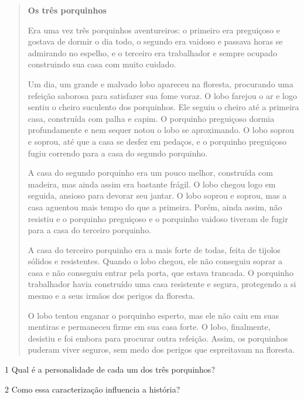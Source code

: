 \begin{quote}
\textbf{Os três porquinhos}

Era uma vez três porquinhos aventureiros: o primeiro era preguiçoso e
gostava de dormir o dia todo, o segundo era vaidoso e passava horas se
admirando no espelho, e o terceiro era trabalhador e sempre ocupado
construindo sua casa com muito cuidado.

Um dia, um grande e malvado lobo apareceu na floresta, procurando uma
refeição saborosa para satisfazer sua fome voraz. O lobo farejou o ar e
logo sentiu o cheiro suculento dos porquinhos. Ele seguiu o cheiro até a
primeira casa, construída com palha e capim. O porquinho preguiçoso
dormia profundamente e nem sequer notou o lobo se aproximando. O lobo
soprou e soprou, até que a casa se desfez em pedaços, e o porquinho
preguiçoso fugiu correndo para a casa do segundo porquinho.

A casa do segundo porquinho era um pouco melhor, construída com madeira,
mas ainda assim era bastante frágil. O lobo chegou logo em seguida,
ansioso para devorar seu jantar. O lobo soprou e soprou, mas a casa
aguentou mais tempo do que a primeira. Porém, ainda assim, não resistiu e
o porquinho preguiçoso e o porquinho vaidoso tiveram de fugir para a casa
do terceiro porquinho.

A casa do terceiro porquinho era a mais forte de todas, feita de tijolos
sólidos e resistentes. Quando o lobo chegou, ele não conseguiu soprar a
casa e não conseguiu entrar pela porta, que estava trancada. O porquinho
trabalhador havia construído uma casa resistente e segura, protegendo a
si mesmo e a seus irmãos dos perigos da floresta.

O lobo tentou enganar o porquinho esperto, mas ele não caiu em suas
mentiras e permaneceu firme em sua casa forte. O lobo, finalmente,
desistiu e foi embora para procurar outra refeição. Assim, os porquinhos
puderam viver seguros, sem medo dos perigos que espreitavam na floresta.

\end{quote}


\num{1} Qual é a personalidade de cada um dos três porquinhos?



\num{2} Como essa caracterização influencia a história?


